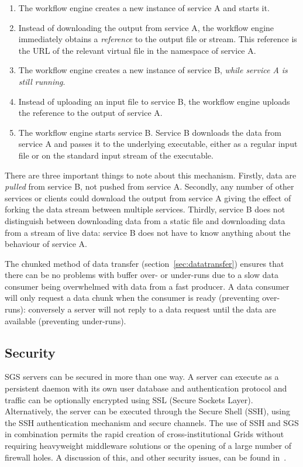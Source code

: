 \documentclass[a4paper]{article}
\begin{document}
\begin{enumerate}
\item The workflow engine creates a new instance of service A and starts it.
\item Instead of downloading the output from service A, the workflow engine immediately obtains a \textit{reference} to the output file or stream.  This reference is the URL of the relevant virtual file in the namespace of service A.
\item The workflow engine creates a new instance of service B, \textit{while service A is still running}.
\item Instead of uploading an input file to service B, the workflow engine uploads the reference to the output of service A.
\item The workflow engine starts service B.  Service B downloads the data from service A and passes it to the underlying executable, either as a regular input file or on the standard input stream of the executable.
\end{enumerate}

There are three important things to note about this mechanism.  Firstly, data are \textit{pulled} from service B, not pushed from service A.  Secondly, any number of other services or clients could download the output from service A giving the effect of forking the data stream between multiple services.  Thirdly, service B does not distinguish between downloading data from a static file and downloading data from a stream of live data: service B does not have to know anything about the behaviour of service A.

The chunked method of data transfer (section~\ref{sec:datatransfer}) ensures that there can be no problems with buffer over- or under-runs due to a slow data consumer being overwhelmed with data from a fast producer.  A data consumer will only request a data chunk when the consumer is ready (preventing over-runs): conversely a server will not reply to a data request until the data are available (preventing under-runs).

\subsection{Security}
SGS servers can be secured in more than one way.  A server can execute as a persistent daemon with its own user database and authentication protocol and traffic can be optionally encrypted using SSL (Secure Sockets Layer).  Alternatively, the server can be executed through the Secure Shell (SSH), using the SSH authentication mechanism and secure channels.  The use of SSH and SGS in combination permits the rapid creation of cross-institutional Grids without requiring heavyweight middleware solutions or the opening of a large number of firewall holes.  A discussion of this, and other security issues, can be found in~\cite{blower_escience:2006}. 
\end{document}
